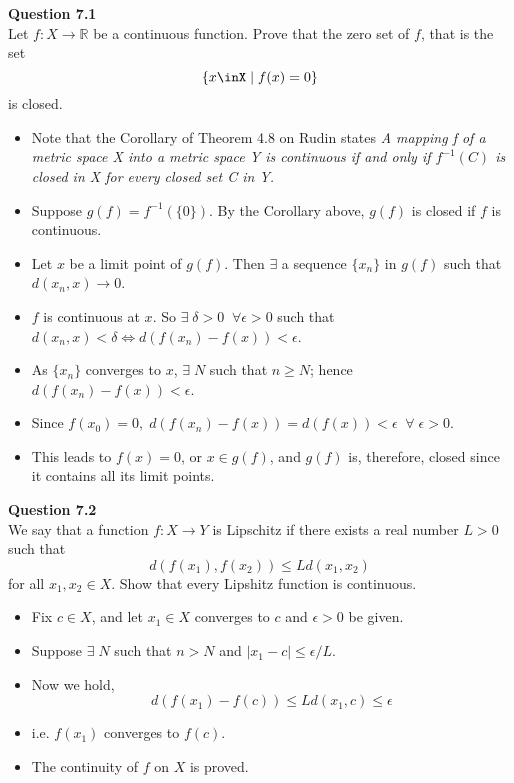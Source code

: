 \documentclass[12pt]{article}
\begin{document}



\textbf{Question 7.1}\\
Let $f\colon X\rightarrow \mathbb{R}$ be a continuous function. Prove that the zero set of $f$, that is the set 
$$\{x\inX\;|\;f(x)=0\}$$ is closed.
\begin{itemize}
    \item Note that the Corollary of Theorem 4.8 on Rudin states {\sl A mapping f of a metric space X into a metric space Y is continuous if and only if $f^{-1}(C)$ is closed in X for every closed set C in Y.}
    \item Suppose $g(f) = f^{-1}(\{0\})$. By the Corollary above, $g(f)$ is closed if $f$ is continuous.\\
    
    \item Let $x$ be a limit point of $g(f)$. Then $\exists$ a sequence $\{x_n\}$ in $g(f)$ such that $d(x_n,x)\rightarrow 0$.
    \item $f$ is continuous at $x$. So $\exists\; \delta>0\;\;\forall \epsilon>0$ such that $d(x_n,x)<\delta \Leftrightarrow d(f(x_n)-f(x))<\epsilon$.
    \item As $\{x_n\}$ converges to $x$, $\exists\; N$ such that $n\ge N$; hence $d(f(x_n)-f(x))<\epsilon$.
    \item Since $f(x_0)=0,\; d(f(x_n)-f(x)) = d(f(x)) < \epsilon \;\;\forall\; \epsilon>0.$
    \item This leads to $f(x) = 0$, or $x\in g(f)$, and $g(f)$ is, therefore, closed since it contains all its limit points.
    
\end{itemize}


\vspace{1.5\baselineskip}
\textbf{Question 7.2}\\
We say that a function $f\colon X\rightarrow Y$ is Lipschitz if there exists a real number $L>0$ such that 
$$d(f(x_1),f(x_2))\le Ld(x_1,x_2)$$ for all $x_1,x_2\in X$.
Show that every Lipshitz function is continuous.
\begin{itemize}
    \item Fix $c\in X$, and let $x_1\in X$ converges to $c$ and $\epsilon>0$ be given.
    \item Suppose $\exists\; N$ such that $n>N$ and $|x_1 - c| \le \epsilon / L$.
    \item Now we hold, $$d(f(x_1)-f(c)) \le Ld(x_1,c)\le \epsilon$$
    \item i.e. $f(x_1)$ converges to $f(c)$.
    \item The continuity of $f$ on $X$ is proved.
\end{itemize}
\end{document}
